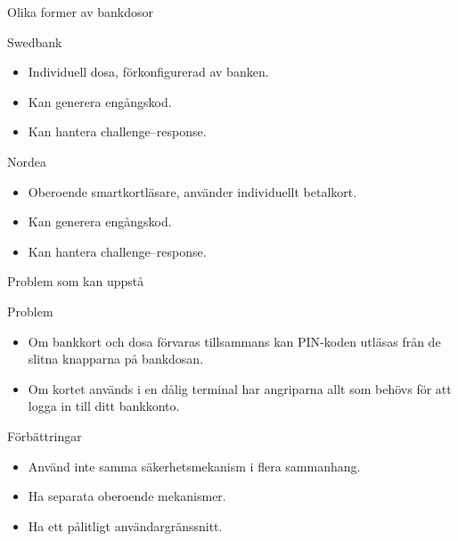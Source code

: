 \documentclass{beamer}
\begin{document}
\begin{frame}{\insertsubsectionhead}{Olika former av bankdosor}
  \begin{block}{Swedbank}
    \begin{itemize}
      \item Individuell dosa, förkonfigurerad av banken.
      \item Kan generera engångskod.
      \item Kan hantera challenge--response.
    \end{itemize}
  \end{block}
  \begin{block}{Nordea}
    \begin{itemize}
      \item Oberoende smartkortläsare, använder individuellt betalkort.
      \item Kan generera engångskod.
      \item Kan hantera challenge--response.
    \end{itemize}
  \end{block}
\end{frame}

\begin{frame}{\insertsubsectionhead}{Problem som kan uppstå}
  \begin{block}{Problem}
    \begin{itemize}
      \item Om bankkort och dosa förvaras tillsammans kan PIN-koden utläsas 
        från de slitna knapparna på bankdosan.
      \item Om kortet används i en dålig terminal har angriparna allt som 
        behövs för att logga in till ditt bankkonto.
    \end{itemize}
  \end{block}
  \begin{block}{Förbättringar}
    \begin{itemize}
      \item Använd inte samma säkerhetsmekanism i flera sammanhang.
      \item Ha separata oberoende mekanismer.
      \item Ha ett pålitligt användargränssnitt.
    \end{itemize}
  \end{block}
\end{frame}

\end{document}
